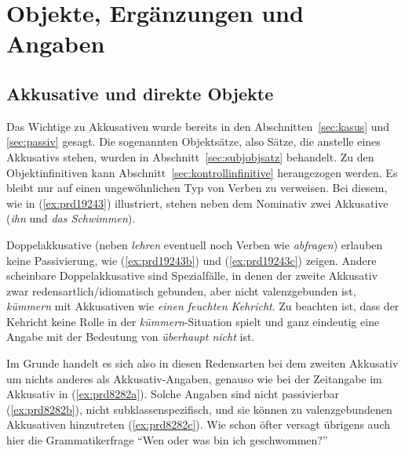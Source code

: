 \section{Objekte, Ergänzungen und Angaben}

\label{sec:objekte}

\subsection{Akkusative und direkte Objekte}


Das Wichtige zu Akkusativen wurde bereits in den Abschnitten~\ref{sec:kasus} und \ref{sec:passiv} gesagt.
Die sogenannten Objektsätze, also Sätze, die anstelle eines Akkusativs stehen, wurden in Abschnitt~\ref{sec:subjobjsatz} behandelt.
Zu den Objektinfinitiven kann Abschnitt~\ref{sec:kontrollinfinitive} herangezogen werden.
Es bleibt nur auf einen ungewöhnlichen Typ von Verben zu verweisen.
Bei diesem, wie in (\ref{ex:prd19243}) illustriert, stehen neben dem Nominativ zwei Akkusative (\textit{ihn} und \textit{das Schwimmen}).

\begin{exe}
  \ex\label{ex:prd19243}
  \begin{xlist}
  \end{xlist}
\end{exe}


Doppelakkusative (neben \textit{lehren} eventuell noch Verben wie \textit{abfragen}) erlauben keine Passivierung, wie (\ref{ex:prd19243b}) und (\ref{ex:prd19243c}) zeigen.
Andere scheinbare Doppelakkusative sind Spezialfälle, in denen der zweite Akkusativ zwar redensartlich\slash idiomatisch gebunden, aber nicht valenzgebunden ist, \zB \textit{kümmern} mit Akkusativen wie \textit{einen feuchten Kehricht}.
Zu beachten ist, dass der Kehricht keine Rolle in der \textit{kümmern}-Situation spielt und ganz eindeutig eine Angabe mit der Bedeutung von \textit{überhaupt nicht} ist.


Im Grunde handelt es sich also in diesen Redensarten bei dem zweiten Akkusativ um nichts anderes als Akkusativ-Angaben, genauso wie bei der Zeitangabe im Akkusativ in (\ref{ex:prd8282a}).
Solche Angaben sind nicht passivierbar (\ref{ex:prd8282b}), nicht subklassenspezifisch, und sie können zu valenzgebundenen Akkusativen hinzutreten (\ref{ex:prd8282c}).
Wie schon öfter versagt übrigens auch hier die Grammatikerfrage "`Wen oder was bin ich geschwommen?"'

